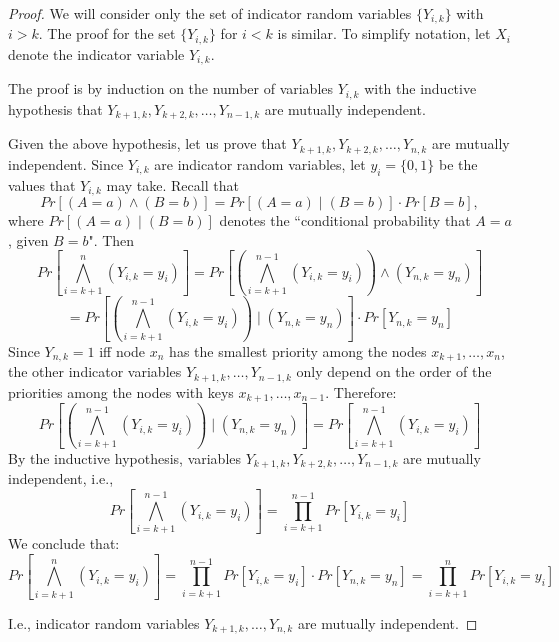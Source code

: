 \documentclass[11pt]{article}
\begin{document}
\begin{proof}
We will consider only the set of indicator random variables  $\{Y_{i,k}\}$ with $i > k$. The proof for the set $\{Y_{i,k}\}$ for $i < k$ is similar.
To simplify notation, let $X_i$ denote the indicator variable $Y_{i,k}$.

The proof is by induction on the number of variables $Y_{i,k}$ with the inductive hypothesis that $ Y_{k+1,k},Y_{k+2,k},\ldots,Y_{n-1,k}$ are mutually independent. 

Given the above hypothesis, let us prove that $Y_{k+1,k},Y_{k+2,k},\ldots,Y_{n,k}$ are mutually independent. Since $Y_{i,k}$ are indicator random variables, let $y_i = \{0,1\}$ be the values that $Y_{i,k}$ may take. Recall that 
$$Pr[(A = a) \wedge (B= b)] = Pr[(A = a) \mid (B=b)] \cdot Pr[B = b],$$ 
where $Pr[(A = a) \mid (B = b)]$ denotes the ``conditional probability that $A = a$, given $B = b$". Then
\[
Pr\left[\bigwedge_{i=k+1}^{n} (Y_{i,k}=y_i)\right]=Pr\left[\left(\bigwedge_{i=k+1}^{n-1} (Y_{i,k}=y_i)\right)\wedge (Y_{n,k}=y_n)\right]
\]
\[
=Pr\left[\left(\bigwedge_{i=k+1}^{n-1} (Y_{i,k}=y_i)\right)\mid(Y_{n,k}=y_n)\right]\cdot Pr[Y_{n,k}=y_n]
\]
Since $Y_{n,k}=1$ iff node $x_n$ has the smallest priority among the nodes $x_{k+1}, \ldots, x_n$, the other indicator variables $Y_{k+1,k}, \ldots, Y_{n-1,k}$ only depend on the order of the priorities among the nodes with keys $x_{k+1}, \ldots, x_{n-1}$. Therefore:
\[
Pr\left[\left(\bigwedge_{i=k+1}^{n-1} (Y_{i,k}=y_i)\right)\mid(Y_{n,k}=y_n)\right]=Pr\left[\bigwedge_{i=k+1}^{n-1} (Y_{i,k}=y_i)\right]
\]
By the inductive hypothesis, variables $Y_{k+1,k},Y_{k+2,k},\ldots,Y_{n-1,k}$ are mutually independent, i.e., 
\[
Pr\left[\bigwedge_{i=k+1}^{n-1} (Y_{i,k}=y_i)\right]=\prod_{i=k+1}^{n-1} Pr[Y_{i,k}=y_i]
\]
We conclude that:
\[
Pr\left[\bigwedge_{i=k+1}^{n} (Y_{i,k}=y_i)\right]=\prod_{i=k+1}^{n-1} Pr[Y_{i,k}=y_i]\cdot Pr[Y_{n,k}=y_n]=\prod_{i=k+1}^{n} Pr[Y_{i,k}=y_i] 
\]

I.e., indicator random variables $Y_{k+1,k}, \ldots, Y_{n,k}$ are mutually independent.
\end{proof}
\end{document}
